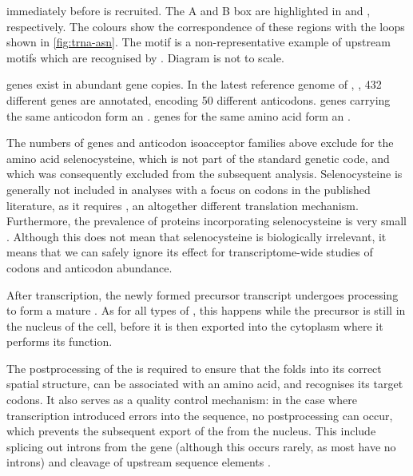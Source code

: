     {immediately before  is recruited. The A and B box are highlighted in
    \primaryname{} and \secondaryname{}, respectively. The colours show the
    correspondence of these regions with the loops shown in \cref{fig:trna-asn}.
    The  motif is a non-representative example of upstream motifs
    which are recognised by . Diagram is not to scale.}

\trna genes exist in abundant gene copies. In the latest reference genome of
\mmu,  \citep{Church:2009}, \num{432} different \trna genes are
annotated, encoding \num{50} different anticodons. \trna genes carrying the same
anticodon form an . \trna genes for the
same amino acid form an .

The numbers of \trna genes and anticodon isoacceptor families above exclude
\trna[s] for the amino acid selenocysteine, which is not part of the standard
genetic code, and which was consequently excluded from the subsequent analysis.
Selenocysteine is generally not included in analyses with a focus on codons in
the published literature, as it requires , an
altogether different translation mechanism. Furthermore, the prevalence of
proteins incorporating selenocysteine is very small \citep{Reeves:2009}.
Although this does not mean that selenocysteine is biologically irrelevant, it
means that we can safely ignore its effect for transcriptome-wide studies of
codons and anticodon abundance.

After transcription, the newly formed precursor \trna transcript undergoes
processing to form a mature \trna. As for all types of \rna, this happens while
the precursor \trna is still in the nucleus of the cell, before it is then
exported into the cytoplasm where it performs its function.

The postprocessing of the \trna is required to ensure that the \trna folds into
its correct spatial structure, can be associated with an amino acid, and
recognises its target codons. It also serves as a quality control mechanism: in
the case where transcription introduced errors into the \trna sequence, no
postprocessing can occur, which prevents the subsequent export of the \trna from
the nucleus. This include splicing out introns from the \trna gene (although
this occurs rarely, as most \trna[s] have no introns) and cleavage of \fivep
upstream sequence elements \citep{Alberts:2002,Berg:2002}.

